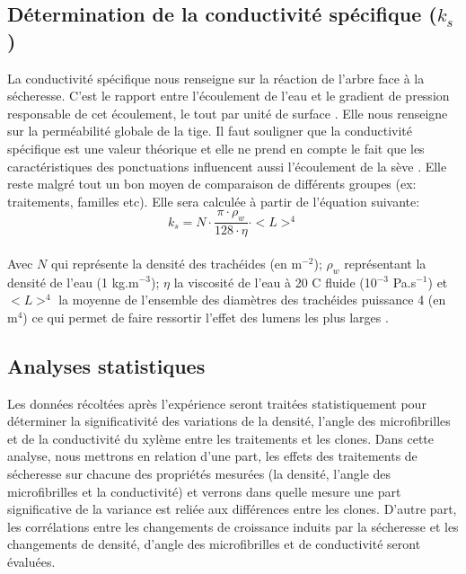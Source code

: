 \documentclass[a4paper,12pt]{report}
\begin{document}
\subsection*{Détermination de la conductivité spécifique ($k_{s}$)}
La conductivité spécifique nous renseigne sur la réaction de l'arbre face à la sécheresse. C'est le rapport entre l’écoulement de l’eau et le gradient de pression responsable de cet écoulement, le tout par unité de surface \citep{Tyree1991}. Elle nous renseigne sur la perméabilité globale de la tige. Il faut souligner que la conductivité spécifique est une valeur théorique et elle ne prend en compte le fait que les caractéristiques des ponctuations influencent aussi l'écoulement de la sève \citep{Pothier1989}. %
Elle reste malgré tout un bon moyen de comparaison de différents groupes (ex: traitements, familles etc).  Elle sera calculée à partir de l'équation suivante: \\

\begin{equation}\label{eq:2}
k_{s} = N\cdot \frac{\pi \cdot \rho_{w}}{128 \cdot \eta} \cdot <L>^{4}
\end{equation}\\

Avec $N$ qui représente la densité des trachéides (en m$^{-2}$); $\rho_{w}$ représentant la densité de l'eau (1 kg.m$^{-3}$); $\eta$ la viscosité de l'eau à 20  \textdegree C fluide (10$^{-3}$ Pa.s$^{-1}$) et $<L>^{4}$ la moyenne de l'ensemble des diamètres des trachéides puissance 4 (en m$^{4}$) ce qui permet de faire ressortir l'effet des lumens les plus larges \citep{Tyree1991}.


\subsection*{Analyses statistiques}
Les données récoltées après l'expérience seront traitées statistiquement pour déterminer la significativité des variations de la densité, l'angle des microfibrilles et de la conductivité du xylème entre les traitements et les clones. Dans cette analyse, nous mettrons en relation d'une part, les effets des traitements de sécheresse sur chacune des propriétés mesurées (la densité, l'angle des microfibrilles et la conductivité) et verrons dans quelle mesure une part significative de la variance est reliée aux différences entre les clones. D'autre part, les corrélations entre les changements de croissance induits par la sécheresse et les changements de densité, d'angle des microfibrilles et de conductivité seront évaluées. \\ 
\end{document}
